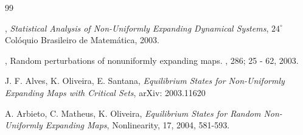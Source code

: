 \documentclass[12pt,a4paper]{amsart}
\theoremstyle{plain}
\begin{document}
	
	\begin{thebibliography}{99}
		
		
		, {\it Statistical Analysis of Non-Uniformly Expanding Dynamical Systems}, $24^{\circ}$ Col\' oquio Brasileiro de Matem\' atica, 2003.
		
		
		
		, {Random perturbations of nonuniformly expanding  maps.}
		, 286; 25 - 62, 2003.
		
		
		
		
		 {\sc J. F. Alves, K. Oliveira, E. Santana}, {\it Equilibrium States for Non-Uniformly Expanding Maps with Critical Sets}, arXiv: 2003.11620 
		
		
		
		
		 {\sc A. Arbieto, C. Matheus, K. Oliveira}, {\it Equilibrium States for Random Non-Uniformly Expanding Maps}, Nonlinearity, 17, 2004, 581-593. 
		

\end{thebibliography}
\end{document}
